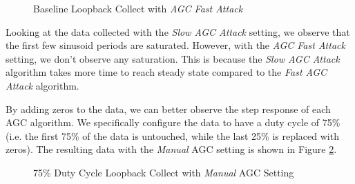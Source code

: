 \documentclass{article}
\begin{document}
\begin{figure}[H]
	\centerline{}
	\caption{Baseline Loopback Collect with \textit{AGC Fast Attack}}
	\label{fig::matlab_loopback_agc_fast_attack}
\end{figure}

Looking at the data collected with the \textit{Slow AGC Attack} setting, we observe that the first few sinusoid periods are saturated. However, with the \textit{AGC Fast Attack} setting, we don't observe any saturation. This is because the \textit{Slow AGC Attack} algorithm takes more time to reach steady state compared to the \textit{Fast AGC Attack} algorithm.

By adding zeros to the data, we can better observe the step response of each AGC algorithm. We specifically configure the data to have a duty cycle of 75\% (i.e. the first 75\% of the data is untouched, while the last 25\% is replaced with zeros). The resulting data with the \textit{Manual} AGC setting is shown in Figure \ref{fig::matlab_loopback_agc_manual_75p_duty_cycle}.

\begin{figure}[H]
	\centerline{}
	\caption{75\% Duty Cycle Loopback Collect with \textit{Manual} AGC Setting}
	\label{fig::matlab_loopback_agc_manual_75p_duty_cycle}
\end{figure}
\end{document}
